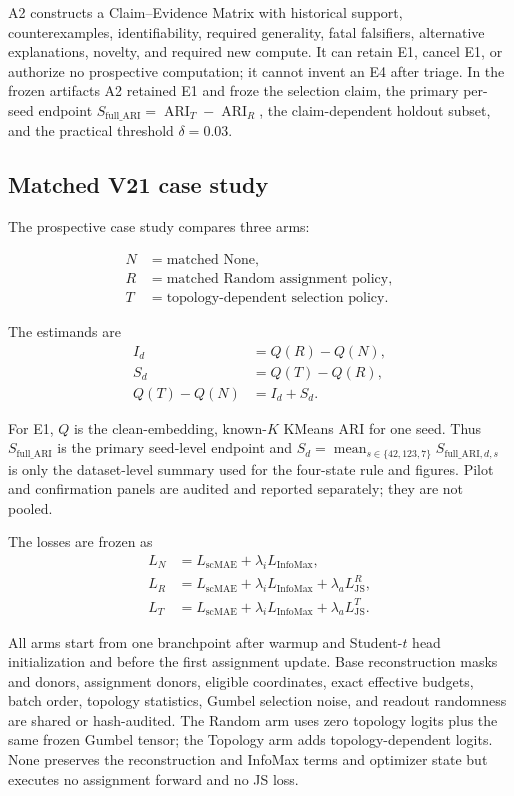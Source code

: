 A2 constructs a Claim--Evidence Matrix with historical support, counterexamples,
identifiability, required generality, fatal falsifiers, alternative
explanations, novelty, and required new compute. It can retain E1, cancel E1,
or authorize no prospective computation; it cannot invent an E4 after triage.
In the frozen artifacts A2 retained E1 and froze the selection claim, the
primary per-seed endpoint
$S_{\mathrm{full\_ARI}}=\operatorname{ARI}_T-\operatorname{ARI}_R$,
the claim-dependent holdout subset, and the practical threshold $\delta=0.03$.

\subsection{Matched V21 case study}

The prospective case study compares three arms:

\begin{align}
N&=\text{matched None},\\
R&=\text{matched Random assignment policy},\\
T&=\text{topology-dependent selection policy}.
\end{align}

The estimands are
\begin{align}
I_d &= Q(R)-Q(N),\\
S_d &= Q(T)-Q(R),\\
Q(T)-Q(N)&=I_d+S_d.
\end{align}

For E1, $Q$ is the clean-embedding, known-$K$ KMeans ARI for one seed. Thus
$S_{\mathrm{full\_ARI}}$ is the primary seed-level endpoint and
$S_d=\operatorname{mean}_{s\in\{42,123,7\}}S_{\mathrm{full\_ARI},d,s}$ is only
the dataset-level summary used for the four-state rule and figures. Pilot and
confirmation panels are audited and reported separately; they are not pooled.

The losses are frozen as
\begin{align}
L_N &= L_{\mathrm{scMAE}}+\lambda_iL_{\mathrm{InfoMax}},\\
L_R &= L_{\mathrm{scMAE}}+\lambda_iL_{\mathrm{InfoMax}}+\lambda_aL_{\mathrm{JS}}^R,\\
L_T &= L_{\mathrm{scMAE}}+\lambda_iL_{\mathrm{InfoMax}}+\lambda_aL_{\mathrm{JS}}^T.
\end{align}

All arms start from one branchpoint after warmup and Student-$t$ head
initialization and before the first assignment update. Base reconstruction
masks and donors, assignment donors, eligible coordinates, exact effective
budgets, batch order, topology statistics, Gumbel selection noise, and readout
randomness are shared or hash-audited. The Random arm uses zero topology logits
plus the same frozen Gumbel tensor; the Topology arm adds topology-dependent
logits. None preserves the reconstruction and InfoMax terms and optimizer state
but executes no assignment forward and no JS loss.


